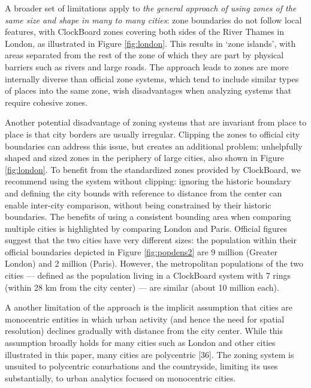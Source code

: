 \documentclass{josis}
\begin{document}
A broader set of limitations apply to \emph{the general approach of using zones of the same size and shape in many to many cities}:
zone boundaries do not follow local features, with ClockBoard zones covering both sides of the River Thames in London, as illustrated in Figure \ref{fig:london}.
This results in `zone islands', with areas separated from the rest of the zone of which they are part by physical barriers such as rivers and large roads.
The approach leads to zones are more internally diverse than official zone systems, which tend to include similar types of places into the same zone, wish disadvantages when analyzing systems that require cohesive zones.

Another potential disadvantage of zoning systems that are invariant from place to place is that city borders are usually irregular.
Clipping the zones to official city boundaries can address this issue, but creates an additional problem: unhelpfully shaped and sized zones in the periphery of large cities, also shown in Figure \ref{fig:london}.
To benefit from the standardized zones provided by ClockBoard, we recommend using the system without clipping: ignoring the historic boundary and defining the city bounds with reference to distance from the center can enable inter-city comparison, without being constrained by their historic boundaries.
The benefits of using a consistent bounding area when comparing multiple cities is highlighted by comparing London and Paris.
Official figures suggest that the two cities have very different sizes: the population within their official boundaries depicted in Figure \ref{fig:popdens2} are 9 million (Greater London) and 2 million (Paris).
However, the metropolitan populations of the two cities --- defined as the population living in a ClockBoard system with 7 rings (within 28 km from the city center) --- are similar (about 10 million each).

A another limitation of the approach is the implicit assumption that cities are monocentric entities in which urban activity (and hence the need for spatial resolution) declines gradually with distance from the city center.
While this assumption broadly holds for many cities such as London and other cities illustrated in this paper, many cities are polycentric {[}36{]}.
The zoning system is unsuited to polycentric conurbations and the countryside, limiting its uses substantially, to urban analytics focused on monocentric cities.
\end{document}
